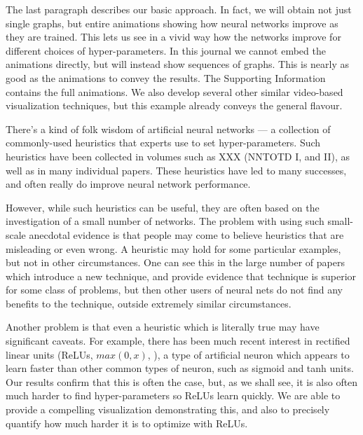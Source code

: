 \documentclass[10pt]{article}
\begin{document}



%
%
The last paragraph describes our basic approach.  In fact, we will
obtain not just single graphs, but entire animations showing how
neural networks improve as they are trained.  This lets us see in a
vivid way how the networks improve for different choices of
hyper-parameters.  In this journal we cannot embed the animations
directly, but will instead show sequences of graphs.  This is nearly
as good as the animations to convey the results.  The Supporting
Information contains the full animations.  We also develop several
other similar video-based visualization techniques, but this example
already conveys the general flavour.

%
%
There's a kind of folk wisdom of artificial neural networks --- a
collection of commonly-used heuristics that experts use to set
hyper-parameters.  Such heuristics have been collected in volumes such
as XXX (NNTOTD I, and II), as well as in many individual papers.
These heuristics have led to many successes, and often really do
improve neural network performance.

%
%
However, while such heuristics can be useful, they are often based on
the investigation of a small number of networks.  The problem with
using such small-scale anecdotal evidence is that people may come to
believe heuristics that are misleading or even wrong.  A heuristic may
hold for some particular examples, but not in other circumstances.
One can see this in the large number of papers which introduce a new
technique, and provide evidence that technique is superior for some
class of problems, but then other users of neural nets do not find any
benefits to the technique, outside extremely similar circumstances.

%
%
Another problem is that even a heuristic which is literally true may
have significant caveats.  For example, there has been much recent
interest in rectified linear units (ReLUs, $max(0,x)$,
\cite{Glorot2010a,Nair2010a,Jarrett2009a}), a type of artificial
neuron which appears to learn faster than other common types of
neuron, such as sigmoid and tanh units. \cite{Krizhevsky2012a} Our
results confirm that this is often the case, but, as we shall see, it
is also often much harder to find hyper-parameters so ReLUs learn
quickly.  We are able to provide a compelling visualization
demonstrating this, and also to precisely quantify how much harder it
is to optimize with ReLUs.
\end{document}
